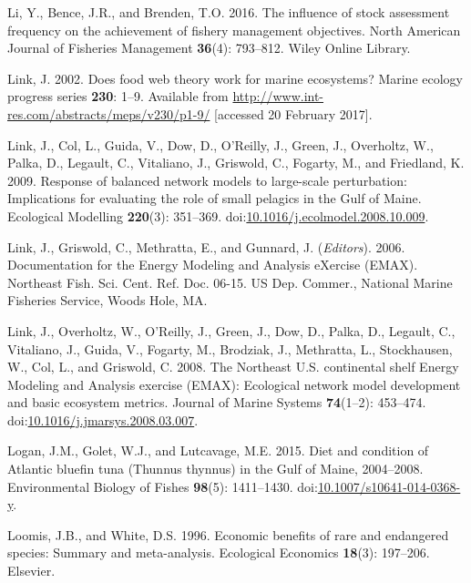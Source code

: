 \documentclass[]{article}
\begin{document}
\hypertarget{ref-li2016influence}{}
Li, Y., Bence, J.R., and Brenden, T.O. 2016. The influence of stock
assessment frequency on the achievement of fishery management
objectives. North American Journal of Fisheries Management
\textbf{36}(4): 793--812. Wiley Online Library.

\hypertarget{ref-link_does_2002}{}
Link, J. 2002. Does food web theory work for marine ecosystems? Marine
ecology progress series \textbf{230}: 1--9. Available from
\url{http://www.int-res.com/abstracts/meps/v230/p1-9/} {[}accessed 20
February 2017{]}.

\hypertarget{ref-link_response_2009}{}
Link, J., Col, L., Guida, V., Dow, D., O'Reilly, J., Green, J.,
Overholtz, W., Palka, D., Legault, C., Vitaliano, J., Griswold, C.,
Fogarty, M., and Friedland, K. 2009. Response of balanced network models
to large-scale perturbation: Implications for evaluating the role of
small pelagics in the Gulf of Maine. Ecological Modelling
\textbf{220}(3): 351--369.
doi:\href{https://doi.org/10.1016/j.ecolmodel.2008.10.009}{10.1016/j.ecolmodel.2008.10.009}.

\hypertarget{ref-link_documentation_2006}{}
Link, J., Griswold, C., Methratta, E., and Gunnard, J. (\emph{Editors}).
2006. Documentation for the Energy Modeling and Analysis eXercise
(EMAX). Northeast Fish. Sci. Cent. Ref. Doc. 06-15. US Dep. Commer.,
National Marine Fisheries Service, Woods Hole, MA.

\hypertarget{ref-link_northeast_2008}{}
Link, J., Overholtz, W., O'Reilly, J., Green, J., Dow, D., Palka, D.,
Legault, C., Vitaliano, J., Guida, V., Fogarty, M., Brodziak, J.,
Methratta, L., Stockhausen, W., Col, L., and Griswold, C. 2008. The
Northeast U.S. continental shelf Energy Modeling and Analysis exercise
(EMAX): Ecological network model development and basic ecosystem
metrics. Journal of Marine Systems \textbf{74}(1--2): 453--474.
doi:\href{https://doi.org/10.1016/j.jmarsys.2008.03.007}{10.1016/j.jmarsys.2008.03.007}.

\hypertarget{ref-logan_diet_2015}{}
Logan, J.M., Golet, W.J., and Lutcavage, M.E. 2015. Diet and condition
of Atlantic bluefin tuna (Thunnus thynnus) in the Gulf of Maine,
2004--2008. Environmental Biology of Fishes \textbf{98}(5): 1411--1430.
doi:\href{https://doi.org/10.1007/s10641-014-0368-y}{10.1007/s10641-014-0368-y}.

\hypertarget{ref-loomis1996economic}{}
Loomis, J.B., and White, D.S. 1996. Economic benefits of rare and
endangered species: Summary and meta-analysis. Ecological Economics
\textbf{18}(3): 197--206. Elsevier.
\end{document}
